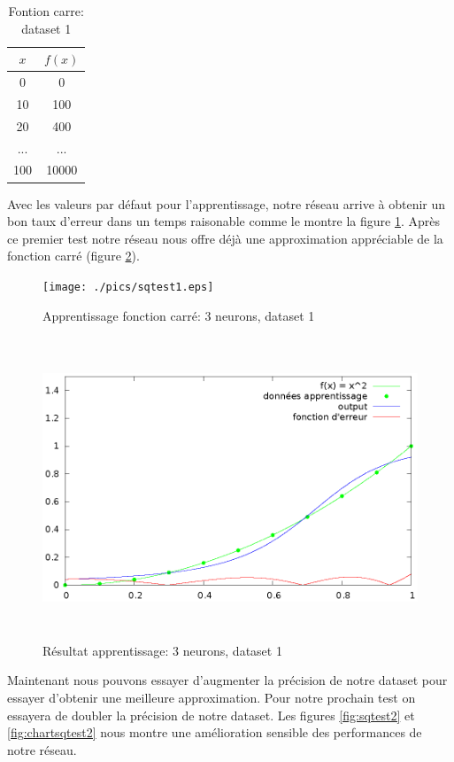 \documentclass[twoside,openright,a4paper,11pt,french]{article}
\begin{document}
\begin{table}[h]
  \centering
  \begin{tabular}{| c | c |}
    \hline
    \textbf{$x$} & \textbf{$f(x)$}\\
    \hline
    0 & 0 \\
    \hline
    10 & 100 \\
    \hline
    20 & 400 \\
    \hline
    ... & ... \\
    \hline
    100 & 10000 \\
    \hline
  \end{tabular}
  \caption{Fontion carre: dataset 1}
  \label{tab:fqt1}
\end{table}

Avec les valeurs par défaut pour l'apprentissage, notre réseau arrive à obtenir
un bon taux d'erreur dans un temps raisonable comme le montre la figure
\ref{fig:sqtest1}. Après ce premier test notre réseau nous offre déjà une
approximation appréciable de la fonction carré (figure \ref{fig:chartsqtest1}).

\begin{figure}[h]
\centering
\texttt{[image: ./pics/sqtest1.eps]}
\caption{Apprentissage fonction carré: 3 neurons, dataset 1}
\label{fig:sqtest1}
\end{figure}

\begin{figure}[h]
\centering
\includegraphics[width=12cm,height=9cm]{./pics/chartsqtest1.eps}
\caption{Résultat apprentissage: 3 neurons, dataset 1}
\label{fig:chartsqtest1}
\end{figure}

Maintenant nous pouvons essayer d'augmenter la précision de notre dataset
pour essayer d'obtenir une meilleure approximation. Pour notre 
prochain test on essayera de doubler la précision de notre dataset.
Les figures \ref{fig:sqtest2} et \ref{fig:chartsqtest2} nous montre 
une amélioration sensible des performances de notre réseau. 
\end{document}
